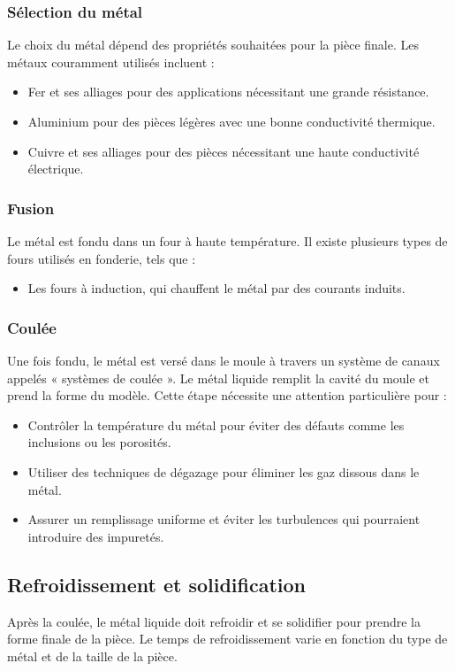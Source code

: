 \documentclass[12pt]{article}
\begin{document}
\subsubsection{Sélection du métal}
Le choix du métal dépend des propriétés souhaitées pour la pièce finale. Les métaux couramment utilisés incluent :

\begin{itemize}
    \item Fer et ses alliages pour des applications nécessitant une grande résistance.
    \item Aluminium pour des pièces légères avec une bonne conductivité thermique.
    \item Cuivre et ses alliages pour des pièces nécessitant une haute conductivité électrique.
\end{itemize}

\subsubsection{Fusion}
Le métal est fondu dans un four à haute température. Il existe plusieurs types de fours utilisés en fonderie, tels que :

\begin{itemize}
    \item Les fours à induction, qui chauffent le métal par des courants induits.
\end{itemize}

\subsubsection{Coulée}
Une fois fondu, le métal est versé dans le moule à travers un système de canaux appelés « systèmes de coulée ». Le métal liquide remplit la cavité du moule et prend la forme du modèle. Cette étape nécessite une attention particulière pour :

\begin{itemize}
    \item Contrôler la température du métal pour éviter des défauts comme les inclusions ou les porosités.
    \item Utiliser des techniques de dégazage pour éliminer les gaz dissous dans le métal.
    \item Assurer un remplissage uniforme et éviter les turbulences qui pourraient introduire des impuretés.
\end{itemize}

\subsection{Refroidissement et solidification}
Après la coulée, le métal liquide doit refroidir et se solidifier pour prendre la forme finale de la pièce. Le temps de refroidissement varie en fonction du type de métal et de la taille de la pièce.
\end{document}
